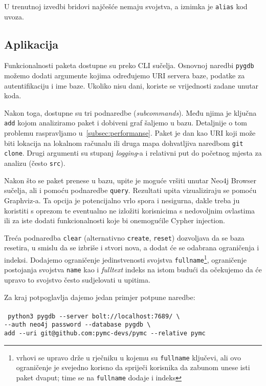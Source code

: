 U trenutnoj izvedbi bridovi najčešće nemaju svojstva, a iznimka je \texttt{alias} kod uvoza.

\newpage
\subsection{Aplikacija}
Funkcionalnosti paketa dostupne su preko CLI sučelja. Osnovnoj naredbi \texttt{pygdb}
možemo dodati argumente kojima određujemo URI servera baze, podatke za autentifikaciju
i ime baze. Ukoliko nisu dani, koriste se vrijednosti zadane unutar koda. 

Nakon toga, dostupne su tri podnaredbe (\textsl{subcommands}). Među njima je ključna
\texttt{add} kojom analiziramo paket i dobiveni graf šaljemo u bazu. Detaljnije
o tom problemu raspravljamo u~\ref{subsec:performanse}. Paket je
dan kao URI koji može biti lokacija na lokalnom računalu ili druga mapa 
dohvatljiva naredbom \texttt{git\- clone}. Drugi argumenti su stupanj \emph{logging}-a
i relativni put do početnog mjesta za analizu (često \texttt{src}).

Nakon što se paket prenese u bazu, upite je moguće vršiti unutar Neo4j Browser sučelja,
ali i pomoću podnaredbe
\texttt{query}. Rezultati upita vizualiziraju se pomoću Graphviz-a. Ta opcija
je potencijalno vrlo spora i nesigurna, dakle treba ju koristiti s oprezom
te eventualno ne izložiti korisnicima s nedovoljnim ovlastima ili za 
iste dodati funkcionalnosti koje bi onemogućile Cypher injection.

Treća podnaredba \texttt{clear} (alternativno \texttt{create}, \texttt{reset})
dozvoljava da se baza resetira, u smislu da se izbriše i stvori nova, a dodat će se
odabrana ograničenja i indeksi. Dodajemo ograničenje jedinstvenosti svojstva
\texttt{fullname}\footnote{vrhovi se upravo drže u rječniku u kojemu su \texttt{fullname} ključevi,
ali ovo ograničenje je svejedno korisno da spriječi korisnika da zabunom
unese isti paket dvaput; time se na \texttt{fullname} dodaje i indeks}, ograničenje
postojanja svojstva \texttt{name} kao i \emph{fulltext} indeks na istom
budući da očekujemo da će upravo to svojstvo često sudjelovati u upitima.

Za kraj potpoglavlja dajemo jedan primjer potpune naredbe: \\ \\
\texttt{
	python3 pygdb -{}-server bolt:\slash\slash localhost:7689\slash\ \textbackslash \\
	-{}-auth neo4j password -{}-database pygdb \textbackslash \\
	add -{}-uri git@github.com:pymc-devs\slash pymc -{}-relative pymc}

